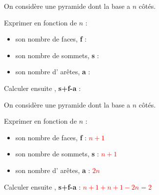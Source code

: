 \begin{exercice*}
    On considère une pyramide dont la base a $n$ côtés.

    Exprimer en fonction de $n$ :
    \begin{itemize}
        \item son nombre de faces, \textbf{f} : \pointilles
        \item son nombre de sommets, \textbf{s} : \pointilles
        \item son nombre d' arêtes, \textbf{a} : \pointilles
    \end{itemize}
    Calculer ensuite , \textbf{s+f-a} : \pointilles
\end{exercice*}
\begin{corrige}
    On considère une pyramide dont la base a $n$ côtés.

    Exprimer en fonction de $n$ :
    \begin{itemize}
        \item son nombre de faces, \textbf{f} :    \textcolor{red}{$n+1$}
        \item son nombre de sommets, \textbf{s} :  \textcolor{red}{$n+1$}
        \item son nombre d' arêtes, \textbf{a} :   \textcolor{red}{$2n$}
    \end{itemize}
    Calculer ensuite , \textbf{s+f-a} : \textcolor{red}{$n+1+n+1-2n=2$}
\end{corrige}

